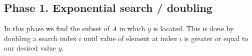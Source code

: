 \documentclass{article}
\begin{document}
\subsection*{Phase 1. Exponential search / doubling}
In this phase we find the subset of $A$ in which $y$ is located. This is done by doubling a search index $i$ until value of element at index $i$ is greater or equal to our desired value $y$.






\end{document}
